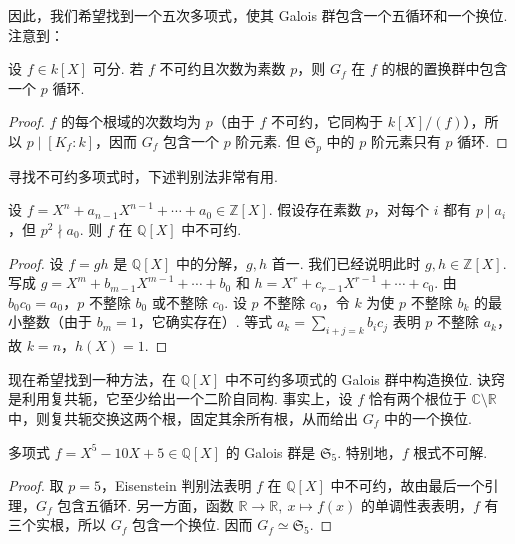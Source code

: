 因此，我们希望找到一个五次多项式，使其 Galois 群包含一个五循环和一个换位. 注意到：
\begin{lemma*}
设 $f\in k[X]$ 可分. 若 $f$ 不可约且次数为素数 $p$，则 $G_f$ 在 $f$ 的根的置换群中包含一个 $p$ 循环.
\end{lemma*}
\begin{proof}
$f$ 的每个根域的次数均为 $p$（由于 $f$ 不可约，它同构于 $k[X]/(f)$），所以 $p\mid[K_f:k]$，因而 $G_f$ 包含一个 $p$ 阶元素. 但 $\mathfrak S_p$ 中的 $p$ 阶元素只有 $p$ 循环.
\end{proof}
寻找不可约多项式时，下述判别法非常有用.
\begin{proposition*}
设 $f=X^n+a_{n-1}X^{n-1}+\cdots+a_0\in\mathbb Z[X]$. 假设存在素数 $p$，对每个 $i$ 都有 $p\mid a_i$，但 $p^2\nmid a_0$. 则 $f$ 在 $\mathbb Q[X]$ 中不可约.
\end{proposition*}
\begin{proof}
设 $f=gh$ 是 $\mathbb Q[X]$ 中的分解，$g,h$ 首一. 我们已经说明此时 $g,h\in\mathbb Z[X]$. 写成 $g=X^m+b_{m-1}X^{m-1}+\cdots+b_0$ 和 $h=X^r+c_{r-1}X^{r-1}+\cdots+c_0$. 由 $b_0c_0=a_0$，$p$ 不整除 $b_0$ 或不整除 $c_0$. 设 $p$ 不整除 $c_0$，令 $k$ 为使 $p$ 不整除 $b_k$ 的最小整数（由于 $b_m=1$，它确实存在）. 等式 $a_k=\sum_{i+j=k}b_ic_j$ 表明 $p$ 不整除 $a_k$，故 $k=n$，$h(X)=1$.
\end{proof}
现在希望找到一种方法，在 $\mathbb Q[X]$ 中不可约多项式的 Galois 群中构造换位. 诀窍是利用复共轭，它至少给出一个二阶自同构. 事实上，设 $f$ 恰有两个根位于 $\mathbb C\setminus\mathbb R$ 中，则复共轭交换这两个根，固定其余所有根，从而给出 $G_f$ 中的一个换位.
\begin{corollary*}
多项式 $f=X^5-10X+5\in\mathbb Q[X]$ 的 Galois 群是 $\mathfrak S_5$. 特别地，$f$ 根式不可解.
\end{corollary*}
\begin{proof}
取 $p=5$，Eisenstein 判别法表明 $f$ 在 $\mathbb Q[X]$ 中不可约，故由最后一个引理，$G_f$ 包含五循环. 另一方面，函数 $\mathbb R\longrightarrow\mathbb R,\ x\longmapsto f(x)$ 的单调性表表明，$f$ 有三个实根，所以 $G_f$ 包含一个换位. 因而 $G_f\simeq\mathfrak S_5$.
\end{proof}

